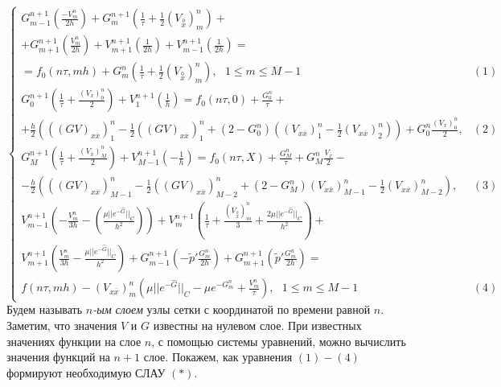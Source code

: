 \documentclass[a4paper, 11pt]{article}
\newcommand{\wide}{
\stackrel{0}{x}
}
\begin{document}
$$
\begin{cases}
\displaystyle{
G_{m-1}^{n+1} \left(\frac{-V_{m}^n}{2h}\right) + G_m^{n+1} \left(\frac{1}{\tau} + \frac{1}{2}\left(V_{\wide}\right)_m^n\right) +}\\
\displaystyle{ +
G_{m+1}^{n+1} \left(\frac{V_m^n}{2h}\right) + V_{m+1}^{n+1} \left(\frac{1}{2h}\right) + V_{m-1}^{n+1}\left(\frac{1}{2h}\right) =} \\
\displaystyle{
= 
f_0 (n\tau, mh) + G_m^n \left(\frac{1}{\tau} 
+\frac{1}{2} \left(V_{\wide}\right)_m^n\right)
,\ \ \  1 \leqslant m \leqslant M - 1} & (1)\\
\displaystyle{
G_0^{n+1} \left(\frac{1}{\tau} + \frac{(V_x)_0^n}{2}\right)
 + V^{n+1}_1 \left(\frac{1}{h}\right) = 
 f_0 (n\tau, 0) + \frac{G_0^n}{\tau} + } \\
 \displaystyle{ +\frac{h}{2} \left( ((GV)_{x\overline{x}})_1^n -\frac{1}{2}((GV)_{x\overline{x}})_1^n + (2 - G_0^n)((V_{x\overline{x}})_1^n - \frac{1}{2}(V_{x\overline{x}})_2^n)\right) + G_0^n \frac{(V_x)_0^n}{2} }, & (2)\\
 \displaystyle{
G_{M}^{n+1} \left(\frac{1}{\tau} + \frac{\left(V_{\overline{x}}\right)_M^n}{2}\right) + V_{M-1}^{n+1} \left(-\frac{1}{h}\right) = 
f_0(n\tau, X) + \frac{G_M^n}{\tau} + G_M^n \frac{V_{\overline{x}}}{2} - } \\
\displaystyle{
-\frac{h}{2}\left(((GV)_{x\overline{x}})_{M-1}^n
-\frac{1}{2}((GV)_{x\overline{x}})_{M-2}^n + (2-G_M^n)(V_{x\overline{x}})_{M-1}^n - 
\frac{1}{2}(V_{x\overline{x}})_{M-2}^n\right)}, & (3)\\
\displaystyle{
V_{m-1}^{n+1} \left(-\frac{V_m^n}{3h}-\left(\frac{\mu \vert\vert e^{-\hat{G}}\vert\vert_C}{h^2} \right) \right) + 
V_m^{n+1} \left(\frac{1}{\tau} + \frac{(V_{\wide})_m^n}{3} + \frac{2\mu \vert\vert e^{-\hat{G}}\vert\vert_C}{h^2}\right) +} \\
\displaystyle {
V_{m+1}^{n+1}\left(\frac{V_m^n}{3h} - 
\frac{\mu \vert\vert e^{-\hat{G}}\vert\vert_C}{h^2}\right) + G_{m-1}^{n+1}\left(-\tilde{p}'\frac{G_m^n}{2h}\right) + 
G_{m+1}^{n+1}\left(
\tilde{p}'\frac{G_m^n}{2h}\right) = } \\
\displaystyle{
 f(n\tau, mh) - (V_{x\overline{x}})_m^n \left(\mu \vert\vert e^{-\hat{G}}\vert\vert_C - \mu e^{-G_m^n} + \frac{V_m^n}{\tau}\right),\ \ \ 1 \leqslant m \leqslant M-1} & (4)
\end{cases}
$$
Будем называть \textit{$n$-ым слоем} узлы сетки с координатой по времени равной $n$.
\enlargethispage{9\baselineskip}
Заметим, что значения $V$ и $G$ известны на нулевом слое.
При известных значениях функции на слое $n$, с помощью системы уравнений, можно вычислить значения функций на $n+1$ слое. Покажем, как уравнения $(1)-(4)$ формируют необходимую СЛАУ $(*)$.
\end{document}
